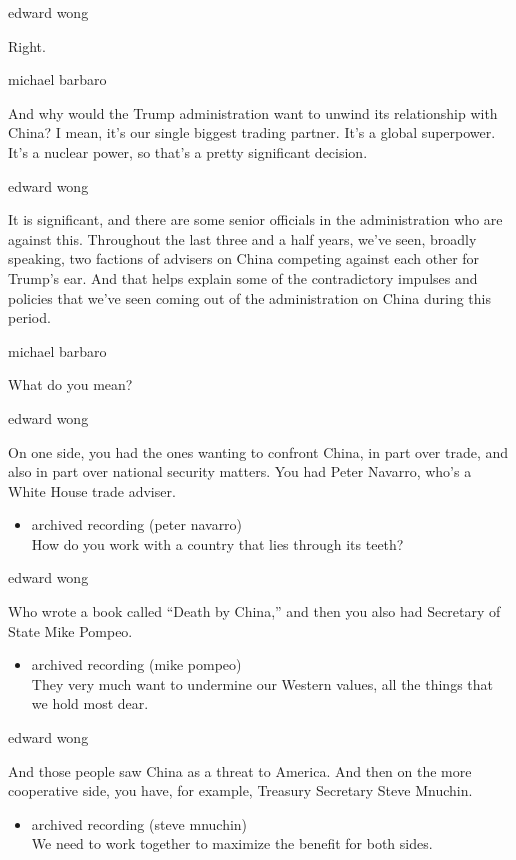 edward wong

Right.

michael barbaro

And why would the Trump administration want to unwind its relationship
with China? I mean, it's our single biggest trading partner. It's a
global superpower. It's a nuclear power, so that's a pretty significant
decision.

edward wong

It is significant, and there are some senior officials in the
administration who are against this. Throughout the last three and a
half years, we've seen, broadly speaking, two factions of advisers on
China competing against each other for Trump's ear. And that helps
explain some of the contradictory impulses and policies that we've seen
coming out of the administration on China during this period.

michael barbaro

What do you mean?

edward wong

On one side, you had the ones wanting to confront China, in part over
trade, and also in part over national security matters. You had Peter
Navarro, who's a White House trade adviser.

\begin{itemize}
\tightlist
\item
  archived recording (peter navarro)\\
  How do you work with a country that lies through its teeth?
\end{itemize}

edward wong

Who wrote a book called ``Death by China,'' and then you also had
Secretary of State Mike Pompeo.

\begin{itemize}
\tightlist
\item
  archived recording (mike pompeo)\\
  They very much want to undermine our Western values, all the things
  that we hold most dear.
\end{itemize}

edward wong

And those people saw China as a threat to America. And then on the more
cooperative side, you have, for example, Treasury Secretary Steve
Mnuchin.

\begin{itemize}
\tightlist
\item
  archived recording (steve mnuchin)\\
  We need to work together to maximize the benefit for both sides.
\end{itemize}

